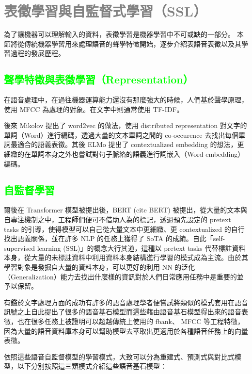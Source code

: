 \setcounter{chapter}{2}
\section{\textcolor{gray}{表徵學習與自監督式學習（SSL）}}

為了讓機器可以理解輸入的資料，表徵學習是機器學習中不可或缺的一部分。
本節將從傳統機器學習用來處理語音的聲學特徵開始，逐步介紹表語音表徵以及其學習過程的發展歷程。

\subsection{\textcolor{lime}{聲學特徵與表徵學習（Representation）}}

在語音處理中，在過往機器運算能力還沒有那麼強大的時候，人們基於聲學原理，使用 MFCC 為處理的對象。在文字中則通常使用 TF-IDF。  %

後來 Mikolov 提出了 word2vec 的做法，使用 distributed representation 對文字的單詞（Word）進行編碼，透過大量的文本單詞之間的 co-occurence 去找出每個單詞最適合的語義表徵。其後 ELMo 提出了 contextualized embedding 的想法，更細緻的在單詞本身之外也嘗試對句子脈絡的語義進行詞嵌入（Word embedding）編碼。

\subsection{\textcolor{lime}{自監督學習}}

爾後在 Transformer 模型被提出後，BERT (cite BERT) 被提出，從大量的文本與自專注機制之中，工程師們便可不借助人為的標記，透過預先設定的 pretext tasks 的引導，使得模型可以自己從大量文本中更細緻、更 contextualized 的自行找出語義關係，並在許多 NLP 的任務上獲得了 SoTA 的成績。自此「self-supervised learning (SSL)」的概念大行其道，這種以 pretext tasks 代替標註資料本身，從大量的未標註資料中利用資料本身結構進行學習的模式成為主流。由於其學習對象是發掘自大量的資料本身，可以更好的利用 NN 的泛化（Generalization）能力去找出什麼樣的資訊對於人們日常應用任務中是重要的並予以保留。

有鑑於文字處理方面的成功有許多的語音處理學者便嘗試將類似的模式套用在語音訊號之上自此提出了很多的語音基石模型而這些藉由語音基石模型得出來的語音表徵，也在很多任務上被證明可以超越傳統上使用的 fbank、 MFCC 等工程特徵，因為大量的語音資料庫本身可以幫助模型去萃取出更適用於各種語音任務上的向量表徵。

依照這些語音自監督模型的學習模式，大致可以分為重建式、預測式與對比式模型，以下分別按照這三類模式介紹這些語音基石模型：

